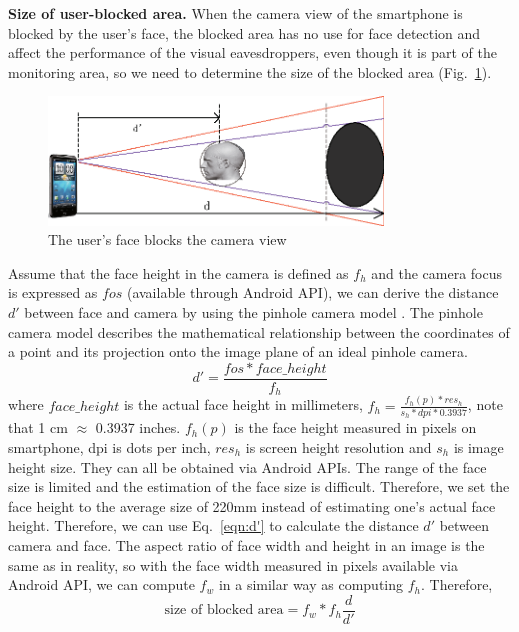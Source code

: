 \textbf{Size of user-blocked area.}
When the camera view of the smartphone is blocked by the user's face, the blocked area has no use for face detection and affect the performance of the visual eavesdroppers, even though it is part of the monitoring area, so we need to determine the size of the blocked area (Fig.~\ref{fig:block}).
\begin{figure}[H]
\centering
\includegraphics[width=3.5in]{blockedarea.eps}
\caption{The user's face blocks the camera view }
\label{fig:block}
\end{figure}

Assume that the face height in the camera is defined as $f_h$ and the camera focus is expressed as $fos$ (available through Android API), we can derive the distance $d'$ between face and camera by using the pinhole camera model \cite{PinholeModel}. The pinhole camera model describes the mathematical relationship between the coordinates of a point and its projection onto the image plane of an ideal pinhole camera.
\begin{equation}
d'=\frac{fos*face\_height}{f_h}
\label{eqn:d'}
\end{equation}
where $face\_height$ is the actual face height in millimeters,
$f_h=\frac{f_h(p)*res_h}{s_h*dpi*0.3937}$, note that 1 cm $\approx$ 0.3937  inches.  $f_h(p)$ is the face height measured in pixels on smartphone, dpi is dots per inch, $res_h$ is screen height resolution  and  $s_h$ is image height size.  They can all be obtained via Android APIs.
The range of the face size is limited and the  estimation of the face size is difficult. Therefore, we set the face height to the average size of 220mm instead of estimating one's actual face height. Therefore, we can use Eq.~\ref{eqn:d'} to calculate the distance $d'$ between camera and face. %
The aspect ratio of face width and height in an image is the same as in reality, so with the face width measured in pixels available via Android API, we can compute $f_w$ in a similar way as computing $f_h$.  Therefore,
\begin{equation}
\textrm{size of blocked area} = f_w*f_h\frac{d}{d'}
\end{equation}


